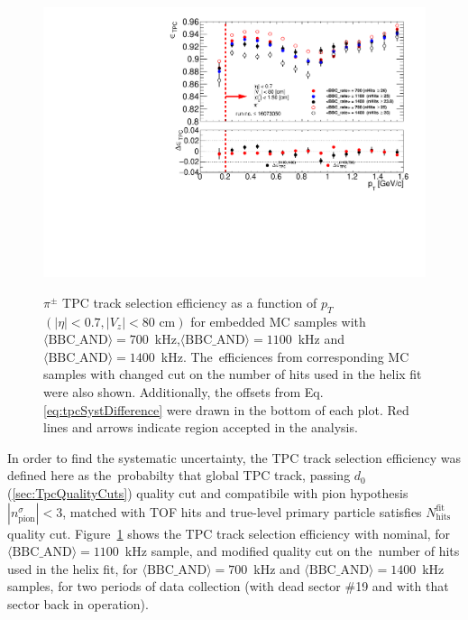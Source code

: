 \begin{figure}[b!]
{	}~
	\parbox{0.495\textwidth}{
		\centering
		\includegraphics[width=\linewidth,page=4]{graphics/systematicsEfficiency/bbc_and/tpcEffi.pdf}\\
	}\vspace{-6pt}
	\caption[$\pi^\pm$  TPC track selection efficiency as a function of $p_T$ $\left(|\eta|<0.7, |V_z|<80\text{ cm}\right)$ for embedded MC samples with \mbox{$\langle\text{BBC\_AND}\rangle=700$~kHz} and \mbox{$\langle\text{BBC\_AND}\rangle=1400$~kHz}]{$\pi^\pm$  TPC track selection efficiency as a function of $p_T$ $\left(|\eta|<0.7, |V_z|<80\text{ cm}\right)$ for embedded MC samples with \mbox{$\langle\text{BBC\_AND}\rangle=700$~kHz},\mbox{$\langle\text{BBC\_AND}\rangle=1100$~kHz} and \mbox{$\langle\text{BBC\_AND}\rangle=1400$~kHz}. The~efficiences from corresponding MC samples with changed cut on the number of hits used in the helix fit were also shown. Additionally, the offsets  from Eq. \ref{eq:tpcSystDifference} were drawn in the bottom of each plot. Red lines and arrows indicate region accepted in the analysis.}
	\label{fig:systError1Dtpc}
\end{figure}

In order to find the systematic uncertainty,  the  TPC track selection efficiency was defined here as the~probabilty that global TPC track, passing  $d_0$ (\ref{sec:TpcQualityCuts}) quality cut and compatibile with pion hypothesis $|n^{\sigma}_{\text{pion}}|<3$,  matched with TOF hits and true-level primary particle satisfies $N_{\text{hits}}^{\text{fit}}$ quality cut.  
Figure~\ref{fig:systError1Dtpc} shows the  TPC track selection efficiency with nominal, for   \mbox{$\langle\text{BBC\_AND}\rangle=1100$~kHz} sample, and modified quality cut on the~number of hits used in the helix fit, for \mbox{$\langle\text{BBC\_AND}\rangle=700$~kHz} and \mbox{$\langle\text{BBC\_AND}\rangle=1400$~kHz} samples, for two periods of data collection (with dead sector \#19 and with that sector back in operation). 



